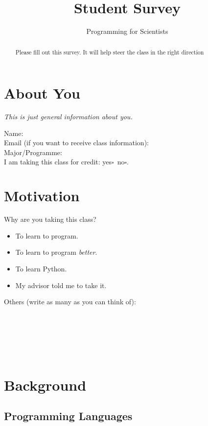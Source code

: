 \documentclass[article,twoside]{memoir}
\title{Student Survey}
\author{Programming for Scientists}
\newcommand*{\fillunderscore}{~\hrulefill}
\newcommand*{\checkbox}{$\square$}
\newcommand*{\yesno}{\hfill\mbox{yes\checkbox~no\checkbox}}
\newcommand{\header}[1]{\textsl{#1}}
\begin{document}
\maketitle
\begin{abstract}
Please fill out this survey. It will help steer the class in the right direction
\end{abstract}

\chapter{About You}

\header{This is just general information about you.}

Name: \fillunderscore\\
Email (if you want to receive class information): \fillunderscore\\
Major/Programme: \fillunderscore\\
I am taking this class for credit: \yesno.

\chapter{Motivation}

Why are you taking this class?
\begin{itemize}[\checkbox]
\item To learn to program.
\item To learn to program \emph{better}.
\item To learn Python.
\item My advisor told me to take it.
\end{itemize}

Others (write as many as you can think of): \fillunderscore\par
\fillunderscore\par
\fillunderscore\par
\fillunderscore

\chapter{Background}

\section{Programming Languages}
\end{document}
